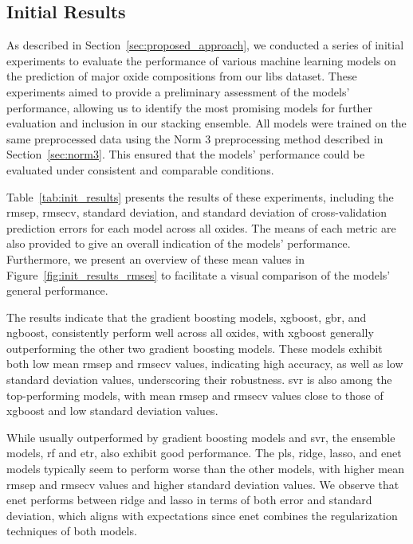 \subsection{Initial Results}
As described in Section~\ref{sec:proposed_approach}, we conducted a series of initial experiments to evaluate the performance of various machine learning models on the prediction of major oxide compositions from our \gls{libs} dataset.
These experiments aimed to provide a preliminary assessment of the models' performance, allowing us to identify the most promising models for further evaluation and inclusion in our stacking ensemble.
All models were trained on the same preprocessed data using the Norm 3 preprocessing method described in Section~\ref{sec:norm3}.
This ensured that the models' performance could be evaluated under consistent and comparable conditions.

Table~\ref{tab:init_results} presents the results of these experiments, including the \gls{rmsep}, \gls{rmsecv}, standard deviation, and standard deviation of cross-validation prediction errors for each model across all oxides.
The means of each metric are also provided to give an overall indication of the models' performance.
Furthermore, we present an overview of these mean values in Figure~\ref{fig:init_results_rmses} to facilitate a visual comparison of the models' general performance.

The results indicate that the gradient boosting models, \gls{xgboost}, \gls{gbr}, and \gls{ngboost}, consistently perform well across all oxides, with \gls{xgboost} generally outperforming the other two gradient boosting models.
These models exhibit both low mean \gls{rmsep} and \gls{rmsecv} values, indicating high accuracy, as well as low standard deviation values, underscoring their robustness.
\gls{svr} is also among the top-performing models, with mean \gls{rmsep} and \gls{rmsecv} values close to those of \gls{xgboost} and low standard deviation values.

While usually outperformed by gradient boosting models and \gls{svr}, the ensemble models, \gls{rf} and \gls{etr}, also exhibit good performance.
The \gls{pls}, ridge, \gls{lasso}, and \gls{enet} models typically seem to perform worse than the other models, with higher mean \gls{rmsep} and \gls{rmsecv} values and higher standard deviation values.
We observe that \gls{enet} performs between ridge and \gls{lasso} in terms of both error and standard deviation, which aligns with expectations since \gls{enet} combines the regularization techniques of both models.

